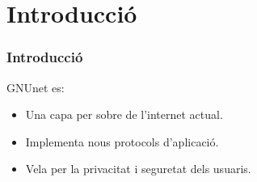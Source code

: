 \section{Introducció}

\begin{frame}
\frametitle{Introducció}
GNUnet es:

\begin{itemize}
  \item<1-> Una capa per sobre de l'internet actual.
  \item<2-> Implementa nous protocols d'aplicació.
  \item<3-> Vela per la privacitat i seguretat dels usuaris.
\end{itemize}
\end{frame}
